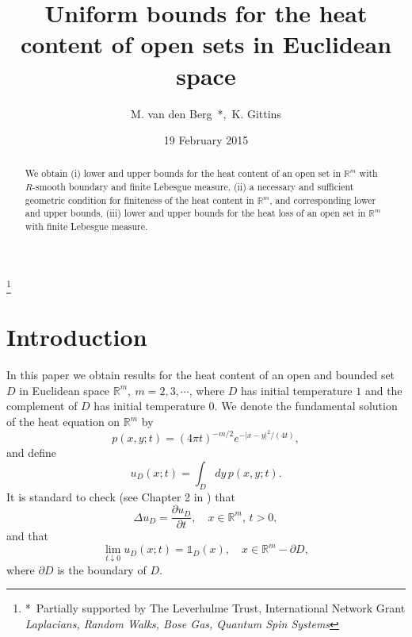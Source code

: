 \documentclass[a4paper,9pt]{amsart}
\begin{document}
\title{Uniform bounds for the heat content of open sets in Euclidean space}
\date{19 February 2015}

\author{M. van den Berg\ *,\ K. Gittins}
\thanks{*\ Partially supported by The Leverhulme Trust,
International Network Grant \emph{Laplacians, Random Walks, Bose
Gas, Quantum Spin Systems}}
\address{School of Mathematics\\ University of Bristol\\
University Walk\\ Bristol\\ BS8 1TW, U.K.}
    \maketitle
\begin{abstract}
We obtain (i) lower and upper bounds for the heat content of an
open set in ${\mathbb{R}}^m$ with $R$-smooth boundary and finite Lebesgue
measure, (ii) a necessary and sufficient geometric condition for
finiteness of the heat content in ${\mathbb{R}}^m$, and corresponding lower
and upper bounds, (iii) lower and upper bounds for the heat loss
of an open set in ${\mathbb{R}}^m$ with finite Lebesgue measure.
\end{abstract}

\section{Introduction}
In this paper we obtain results for the heat content of an open
and bounded set $D$ in Euclidean space ${\mathbb{R}}^m,\ m=2,3,\cdots$,
where $D$ has initial temperature $1$ and the complement of $D$
has initial temperature $0$. We denote the fundamental solution of
the heat equation on ${\mathbb{R}}^m$ by
\begin{equation*}
p(x,y;t)=(4\pi t)^{-m/2}e^{-\vert x - y \vert^{2}/(4t)},
\end{equation*}
and define
\begin{equation}
u_{D}(x;t)=\int_{D} dy \, p(x,y;t). \label{e5}
\end{equation}
It is standard to check (see Chapter 2 in \cite{LCE}) that
\begin{equation}\label{e1}
\Delta u_{D} = \frac{\partial u_{D}}{\partial t}, \quad x \in
\mathbb{R}^{m}, \, t>0,
\end{equation}
and that
\begin{equation}\label{e2}
\lim_{t \downarrow 0}u_D(x;t)= \mathds{1}_{D}(x), \quad x \in
\mathbb{R}^{m}-\partial D,
\end{equation}
where $\partial D$ is the boundary of $D$.
\end{document}
